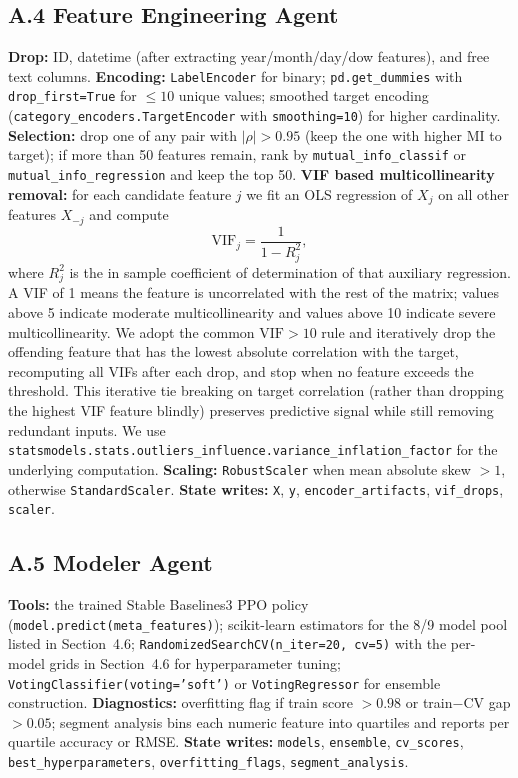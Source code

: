 \documentclass{article}
\begin{document}
\subsection*{A.4 Feature Engineering Agent}
\textbf{Drop:} ID, datetime (after extracting year/month/day/dow features),
and free text columns.
\textbf{Encoding:} \texttt{LabelEncoder} for binary; \texttt{pd.get\_dummies}
with \texttt{drop\_first=True} for $\leq 10$ unique values; smoothed target
encoding (\texttt{category\_encoders.TargetEncoder} with \texttt{smoothing=10})
for higher cardinality.
\textbf{Selection:} drop one of any pair with $|\rho| > 0.95$ (keep the one
with higher MI to target); if more than 50 features remain, rank by
\texttt{mutual\_info\_classif} or \texttt{mutual\_info\_regression} and keep
the top 50.
\textbf{VIF based multicollinearity removal:} for each candidate feature $j$
we fit an OLS regression of $X_j$ on all other features $X_{-j}$ and compute
\begin{equation}
\mathrm{VIF}_j = \frac{1}{1 - R_j^2},
\end{equation}
where $R_j^2$ is the in sample coefficient of determination of that
auxiliary regression. A VIF of 1 means the feature is uncorrelated with
the rest of the matrix; values above 5 indicate moderate multicollinearity
and values above 10 indicate severe multicollinearity. We adopt the
common $\mathrm{VIF} > 10$ rule and iteratively drop the offending feature
that has the lowest absolute correlation with the target, recomputing all
VIFs after each drop, and stop when no feature exceeds the threshold.
This iterative tie breaking on target correlation (rather than dropping the
highest VIF feature blindly) preserves predictive signal while still
removing redundant inputs. We use \texttt{statsmodels.stats.outliers\_influence.variance\_inflation\_factor}
for the underlying computation.
\textbf{Scaling:} \texttt{RobustScaler} when mean absolute skew $>1$,
otherwise \texttt{StandardScaler}.
\textbf{State writes:} \texttt{X}, \texttt{y}, \texttt{encoder\_artifacts},
\texttt{vif\_drops}, \texttt{scaler}.

\subsection*{A.5 Modeler Agent}
\textbf{Tools:} the trained Stable Baselines3 PPO policy
(\texttt{model.predict(meta\_features)}); scikit-learn estimators for the
8/9 model pool listed in Section~4.6;
\texttt{RandomizedSearchCV(n\_iter=20, cv=5)} with the per-model grids in
Section~4.6 for hyperparameter tuning; \texttt{VotingClassifier(voting='soft')}
or \texttt{VotingRegressor} for ensemble construction.
\textbf{Diagnostics:} overfitting flag if train score $> 0.98$ or train$-$CV gap
$> 0.05$; segment analysis bins each numeric feature into quartiles and
reports per quartile accuracy or RMSE.
\textbf{State writes:} \texttt{models}, \texttt{ensemble},
\texttt{cv\_scores}, \texttt{best\_hyperparameters},
\texttt{overfitting\_flags}, \texttt{segment\_analysis}.
\end{document}
